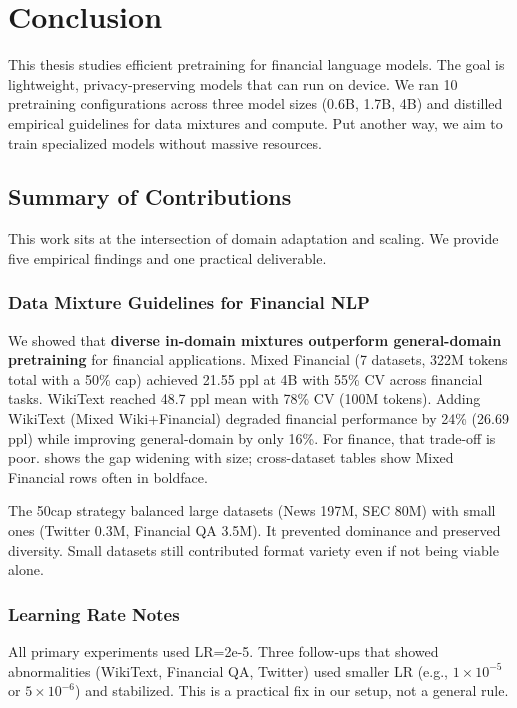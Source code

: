 \chapter{Conclusion}

This thesis studies efficient pretraining for financial language models. The goal is lightweight, privacy‑preserving models that can run on device. We ran 10 pretraining configurations across three model sizes (0.6B, 1.7B, 4B) and distilled empirical guidelines for data mixtures and compute. Put another way, we aim to train specialized models without massive resources.

\section{Summary of Contributions}

This work sits at the intersection of domain adaptation and scaling. We provide five empirical findings and one practical deliverable.

\subsection{Data Mixture Guidelines for Financial NLP}

We showed that \textbf{diverse in-domain mixtures outperform general-domain pretraining} for financial applications. Mixed Financial (7 datasets, 322M tokens total with a 50\% cap) achieved 21.55 ppl at 4B with 55\% CV across financial tasks. WikiText reached 48.7 ppl mean with 78\% CV (100M tokens). Adding WikiText (Mixed Wiki+Financial) degraded financial performance by 24\% (26.69 ppl) while improving general-domain by only 16\%. For finance, that trade-off is poor.  shows the gap widening with size; cross-dataset tables show Mixed Financial rows often in boldface.

The 50cap strategy balanced large datasets (News 197M, SEC 80M) with small ones (Twitter 0.3M, Financial QA 3.5M). It prevented dominance and preserved diversity. Small datasets still contributed format variety even if not being viable alone.

\subsection{Learning Rate Notes}

All primary experiments used LR=2e-5. Three follow‑ups that showed abnormalities (WikiText, Financial QA, Twitter) used smaller LR (e.g., $1\times10^{-5}$ or $5\times10^{-6}$) and stabilized. This is a practical fix in our setup, not a general rule.

